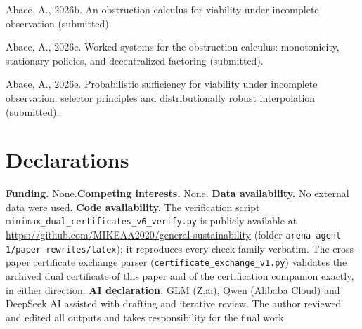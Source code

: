 \documentclass[10pt,twocolumn]{article}
\theoremstyle{definition}
\begin{document}
Abaee, A., 2026b. An obstruction calculus for viability under incomplete
observation (submitted).

Abaee, A., 2026c. Worked systems for the obstruction calculus:
monotonicity, stationary policies, and decentralized factoring
(submitted).

Abaee, A., 2026e. Probabilistic sufficiency for viability under incomplete
observation: selector principles and distributionally robust interpolation
(submitted).

\section*{Declarations}
\textbf{Funding.} None.\quad \textbf{Competing interests.} None.\quad
\textbf{Data availability.} No external data were used.\quad
\textbf{Code availability.} The verification script
\texttt{minimax\_dual\_certificates\_v6\_verify.py} is publicly available
at \url{https://github.com/MIKEAA2020/general-sustainability} (folder
\texttt{arena agent 1/paper rewrites/latex}); it reproduces every check family verbatim. The cross-paper certificate
exchange parser (\texttt{certificate\_exchange\_v1.py}) validates the
archived dual certificate of this paper and of the certification companion
exactly, in either direction.\quad
\textbf{AI declaration.} GLM (Z.ai), Qwen (Alibaba Cloud) and DeepSeek AI
assisted with drafting and iterative review. The author reviewed and
edited all outputs and takes responsibility for the final work.
\end{document}
